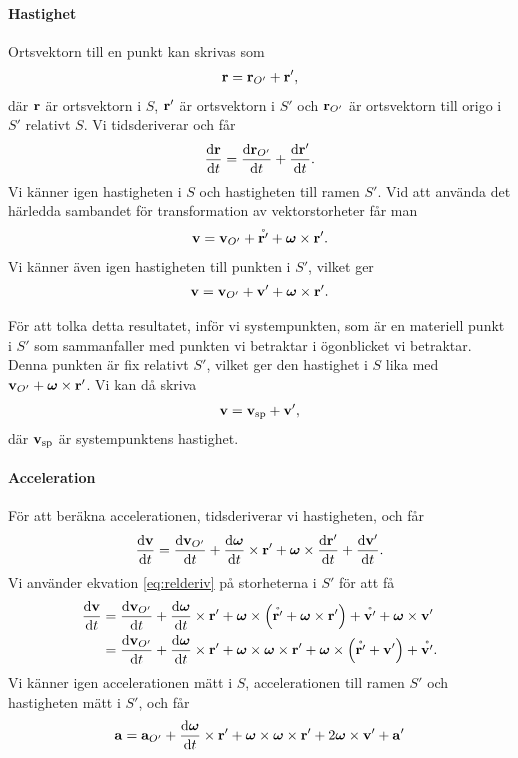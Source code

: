 \paragraph{Hastighet}
Ortsvektorn till en punkt kan skrivas som
\begin{align*}
	\vb{r} = \vb{r}_{O'} + \vb{r}',
\end{align*}
där $\vb{r}$ är ortsvektorn i $S$, $\vb{r}'$ är ortsvektorn i $S'$ och $\vb{r}_{O'}$ är ortsvektorn till origo i $S'$ relativt $S$. Vi tidsderiverar och får
\begin{align*}
	\dv{\vb{r}}{t} = \dv{\vb{r}_{O'}}{t} + \dv{\vb{r}'}{t}.
\end{align*}
Vi känner igen hastigheten i $S$ och hastigheten till ramen $S'$. Vid att använda det härledda sambandet för transformation av vektorstorheter får man
\begin{align*}
	\vb{v} = \vb{v}_{O'} + \mathring{\vb{r}'} + \vb*{\omega}\times\vb{r}'.
\end{align*}
Vi känner även igen hastigheten till punkten i $S'$, vilket ger
\begin{align*}
	\vb{v} = \vb{v}_{O'} + \vb{v}' + \vb*{\omega}\times\vb{r}'.
\end{align*}

För att tolka detta resultatet, inför vi systempunkten, som är en materiell punkt i $S'$ som sammanfaller med punkten vi betraktar i ögonblicket vi betraktar. Denna punkten är fix relativt $S'$, vilket ger den hastighet i $S$ lika med $\vb{v}_{O'} + \vb*{\omega}\times\vb{r}'$. Vi kan då skriva
\begin{align*}
	\vb{v} = \vb{v}_{\text{sp}} + \vb{v}',
\end{align*}
där $\vb{v}_{\text{sp}}$ är systempunktens hastighet.

\paragraph{Acceleration}
För att beräkna accelerationen, tidsderiverar vi hastigheten, och får
\begin{align*}
	\dv{\vb{v}}{t} = \dv{\vb{v}_{O'}}{t} + \dv{\vb*{\omega}}{t}\times\vb{r}' + \vb*{\omega}\times\dv{\vb{r}'}{t} + \dv{\vb{v}'}{t}.
\end{align*}
Vi använder ekvation \ref{eq:relderiv} på storheterna i $S'$ för att få
\begin{align*}
	\dv{\vb{v}}{t} &= \dv{\vb{v}_{O'}}{t} + \dv{\vb*{\omega}}{t}\times\vb{r}' + \vb*{\omega}\times\left(\mathring{\vb{r}'} + \vb*{\omega}\times\vb{r}'\right) + \mathring{\vb{v}'} + \vb*{\omega}\times\vb{v}' \\
	                &= \dv{\vb{v}_{O'}}{t} + \dv{\vb*{\omega}}{t}\times\vb{r}' + \vb*{\omega}\times\vb*{\omega}\times\vb{r}' + \vb*{\omega}\times\left(\mathring{\vb{r}'} + \vb{v}'\right) + \mathring{\vb{v}'}.
\end{align*}
Vi känner igen accelerationen mätt i $S$, accelerationen till ramen $S'$ och hastigheten mätt i $S'$, och får
\begin{align*}
	\vb{a} = \vb{a}_{O'} + \dv{\vb*{\omega}}{t}\times\vb{r}' + \vb*{\omega}\times\vb*{\omega}\times\vb{r}' + 2\vb*{\omega}\times\vb{v}' + \vb{a}'
\end{align*}

